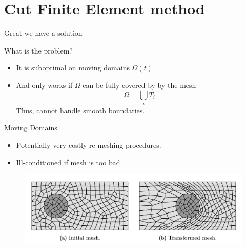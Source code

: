 
\newpage
\section{Cut Finite Element method}%
\label{sec:cut_finite_element_method}

\begin{frame}{Great we have a solution}

    \begin{block}{ What is the problem?  }
        \begin{itemize}
            \item It is suboptimal on moving domains $ \Omega ( t)  $ .
            \item And only works if $\Omega $ can be fully covered by by the mesh \[
            \Omega = \bigcup_i T_{i}
            \]
            Thus, cannot handle smooth boundaries.
        \end{itemize}
    \end{block}
\end{frame}

\begin{frame}{}
    \begin{block}{ Moving Domains }
        \begin{itemize}
            \item Potentially very costly re-meshing procedures.
            \item Ill-conditioned if mesh is too bad
        \end{itemize}
                \begin{figure}
                    \centering
                    \includegraphics[width=0.95 \textwidth]{figures/transformed_mesh.png}
                \end{figure}
    \end{block}
\end{frame}


